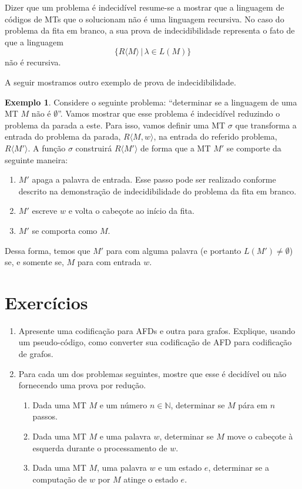 \documentclass[a4paper]{article}
\theoremstyle{definition}
\newtheorem{Example}{Exemplo}
\begin{document}
  Dizer que um problema é indecidível resume-se a mostrar que a linguagem
  de códigos de MTs que o solucionam não é uma linguagem recursiva. No caso do
  problema da fita em branco, a sua prova de indecidibilidade representa o fato
  de que a linguagem
  \[
    \{R\langle M \rangle\,|\,\lambda\in L(M)\}
  \]
  não é recursiva.

  A seguir mostramos outro exemplo de prova de indecidibilidade.

  \begin{Example}
    Considere o seguinte problema: ``determinar se a linguagem de uma MT $M$ não
    é $\emptyset$''. Vamos mostrar que esse problema é indecidível reduzindo o
    problema da parada a este. Para isso, vamos definir uma MT $\sigma$ que
    transforma a entrada do problema da parada, $R\langle M,w \rangle$, na
    entrada do referido problema, $R\langle M' \rangle$. A função $\sigma$
    construirá $R\langle M' \rangle$ de forma que a MT $M'$ se comporte da
    seguinte maneira:
    \begin{enumerate}
      \item $M'$ apaga a palavra de entrada. Esse passo pode ser realizado
        conforme descrito na demonstração de indecidibilidade do problema da
        fita em branco.
      \item $M'$ escreve $w$ e volta o cabeçote ao início da fita.
      \item $M'$ se comporta como $M$.
    \end{enumerate}
    Dessa forma, temos que $M'$ para com alguma palavra (e portanto $L(M') \neq
    \emptyset$) se, e somente se, $M$ para com entrada $w$.
  \end{Example}
  
  \section{Exercícios}

  \begin{enumerate}
     \item Apresente uma codificação para AFDs e outra para grafos. Explique,
       usando um pseudo-código, como converter sua codificação de AFD para
       codificação de grafos.
     \item Para cada um dos problemas seguintes, mostre que esse é decidível ou
       não fornecendo uma prova por redução.
       \begin{enumerate}
          \item Dada uma MT $M$ e um número $n \in \mathbb{N}$, determinar se
            $M$ pára em $n$ passos.
          \item Dada uma MT $M$ e uma palavra $w$, determinar se $M$ move
            o cabeçote à esquerda durante o processamento de $w$.
          \item Dada uma MT $M$, uma palavra $w$ e um estado $e$, determinar
            se a computação de $w$ por $M$ atinge o estado $e$.
       \end{enumerate}
  \end{enumerate}
\end{document}
